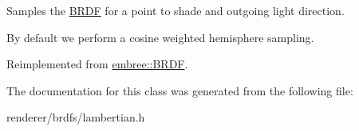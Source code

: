 Samples the \hyperlink{classembree_1_1_b_r_d_f}{BRDF} for a point to shade and outgoing light direction. 

By default we perform a cosine weighted hemisphere sampling. 

Reimplemented from \hyperlink{classembree_1_1_b_r_d_f_a6eb1a114a4f36dc2c1ad65bcbce5f809}{embree::BRDF}.



The documentation for this class was generated from the following file:\begin{DoxyCompactItemize}
\item 
renderer/brdfs/lambertian.h\end{DoxyCompactItemize}

